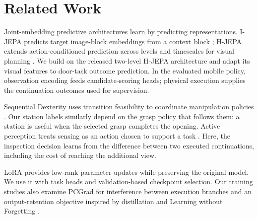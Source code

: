 \section{Related Work}
\label{sec:related}
Joint-embedding predictive architectures learn by predicting representations.
I-JEPA predicts target image-block embeddings from a context block
\citep{assran2023ijepa}; H-JEPA extends action-conditioned prediction across
levels and timescales for visual planning \citep{zhang2026hjepa}. We build on
the released two-level H-JEPA architecture and adapt its visual features to
door-task outcome prediction. In the evaluated mobile policy, observation
encoding feeds candidate-scoring heads; physical execution supplies the
continuation outcomes used for supervision.

Sequential Dexterity uses transition feasibility to coordinate manipulation
policies \citep{chen2023sequential}. Our station labels similarly depend on
the grasp policy that follows them: a station is useful when the selected
grasp completes the opening. Active perception treats sensing as an action
chosen to support a task \citep{bajcsy1988active}. Here, the inspection decision
learns from the difference between two executed continuations, including the
cost of reaching the additional view.

LoRA \citep{hu2021lora} provides low-rank parameter updates while preserving
the original model. We use it with task heads and validation-based checkpoint
selection. Our training studies also examine PCGrad
\citep{yu2020pcgrad} for interference between execution branches and an
output-retention objective inspired by distillation and Learning without
Forgetting \citep{hinton2015distilling,li2016lwf}.
